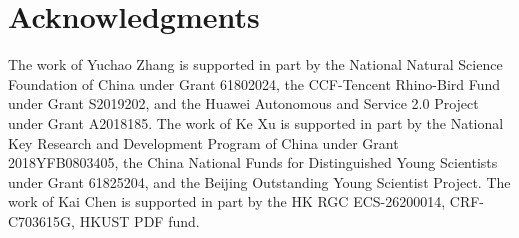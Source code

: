 \section*{Acknowledgments}
The work of Yuchao Zhang is supported in part by the National Natural Science Foundation of China under Grant 61802024, the CCF-Tencent Rhino-Bird Fund under Grant S2019202, and the Huawei Autonomous and Service 2.0 Project under Grant A2018185. The work of Ke Xu is supported in part by the National Key Research and Development Program of China under Grant 2018YFB0803405, the China National Funds for Distinguished Young Scientists under Grant 61825204, and the Beijing Outstanding Young Scientist Project. The work of Kai Chen is supported in part by the HK RGC ECS-26200014, CRF-C703615G, HKUST PDF fund.
